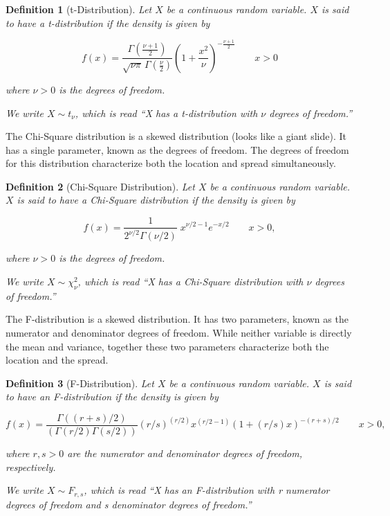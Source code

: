 \documentclass[
]{book}
\theoremstyle{plain}
\theoremstyle{mydefn}
\newtheorem{definition}{Definition}[chapter]
\theoremstyle{myexmpl}
\theoremstyle{remark}
\begin{document}
\begin{definition}[t-Distribution]
\protect\hypertarget{def:defn-t-distribution}{}{\label{def:defn-t-distribution} {} }Let \(X\) be a continuous random variable. \(X\) is said to have a t-distribution if the density is given by

\[f(x) = \frac{\Gamma \left(\frac{\nu+1}{2} \right)} {\sqrt{\nu\pi}\,\Gamma \left(\frac{\nu}{2} \right)} \left(1+\frac{x^2}{\nu} \right)^{-\frac{\nu+1}{2}} \qquad x > 0\]

where \(\nu > 0\) is the degrees of freedom.

We write \(X \sim t_{\nu}\), which is read ``X has a t-distribution with \(\nu\) degrees of freedom.''
\end{definition}

The Chi-Square distribution is a skewed distribution (looks like a giant slide). It has a single parameter, known as the degrees of freedom. The degrees of freedom for this distribution characterize both the location and spread simultaneously.

\begin{definition}[Chi-Square Distribution]
\protect\hypertarget{def:defn-chi-square-distribution}{}{\label{def:defn-chi-square-distribution} {} }Let \(X\) be a continuous random variable. \(X\) is said to have a Chi-Square distribution if the density is given by

\[f(x) = \frac{1}{2^{\nu/2}\Gamma (\nu/2)}\;x^{\nu/2-1}e^{-x/2} \qquad x > 0,\]

where \(\nu > 0\) is the degrees of freedom.

We write \(X \sim \chi^2_{\nu}\), which is read ``X has a Chi-Square distribution with \(\nu\) degrees of freedom.''
\end{definition}

The F-distribution is a skewed distribution. It has two parameters, known as the numerator and denominator degrees of freedom. While neither variable is directly the mean and variance, together these two parameters characterize both the location and the spread.

\begin{definition}[F-Distribution]
\protect\hypertarget{def:defn-f-distribution}{}{\label{def:defn-f-distribution} {} }Let \(X\) be a continuous random variable. \(X\) is said to have an F-distribution if the density is given by

\[f(x) = \frac{\Gamma((r + s)/2)}{(\Gamma(r/2) \Gamma(s/2))} (r/s)^{(r/2)} x^{(r/2 - 1)} (1 + (r/s) x)^{-(r + s)/2} \qquad x > 0,\]

where \(r,s > 0\) are the numerator and denominator degrees of freedom, respectively.

We write \(X \sim F_{r, s}\), which is read ``X has an F-distribution with r numerator degrees of freedom and s denominator degrees of freedom.''
\end{definition}
\end{document}
